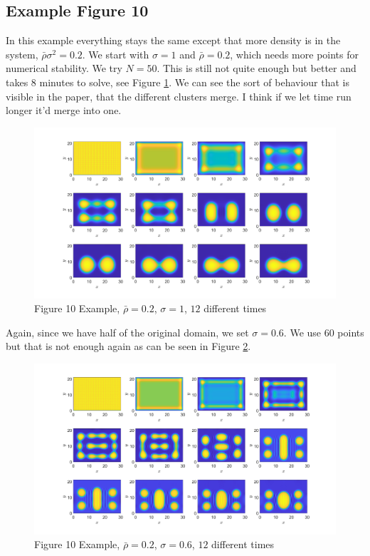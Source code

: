 \documentclass[11pt, a4paper]{article}
\theoremstyle{definition}
\begin{document}
	\subsection{Example Figure 10}
	In this example everything stays the same except that more density is in the system, $\bar \rho \sigma^2 = 0.2$. We start with $\sigma = 1$ and $\bar \rho = 0.2$, which needs more points for numerical stability. We try $N = 50$. This is still not quite enough but better and takes $8$ minutes to solve, see Figure \ref{F4}. We can see the sort of behaviour that is visible in the paper, that the different clusters merge. I think if we let time run longer it'd merge into one.
	\begin{figure}[h]
		\centering
		\includegraphics[scale=0.25]{Ex10F1.png}
		\caption{Figure 10 Example, $\bar \rho = 0.2$, $\sigma = 1$, $12$ different times} 
		\label{F4}
	\end{figure} 
	Again, since we have half of the original domain, we set $\sigma = 0.6$. We use $60$ points but that is not enough again as can be seen in Figure \ref{F4a}.
	\begin{figure}[h]
		\centering
		\includegraphics[scale=0.25]{Ex10F2.png}
		\caption{Figure 10 Example, $\bar \rho = 0.2$, $\sigma = 0.6$, $12$ different times} 
		\label{F4a}
	\end{figure} 
	
\end{document}
